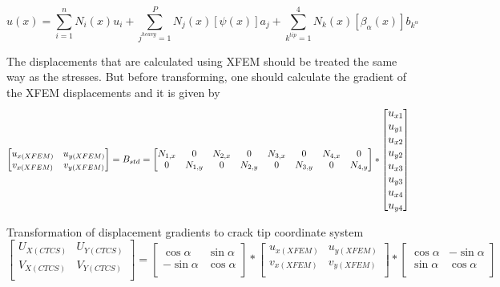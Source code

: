\documentclass[fleqn, 12.5pt,a4paper]{report}
\begin{document}
$$u(x) = \sum_{i=1}^n N_i(x)u_i + \sum_{j^{heavy}=1}^P N_j(x)[\psi(x)] a_j + \sum_{k^{tip}=1}^4 N_k(x)[\beta_{\alpha}(x)] b_{k^\alpha} $$

The displacements that are calculated using XFEM should be treated the same way as the stresses. But before transforming, one should calculate the gradient of the XFEM displacements \cite{ahmed2009extended} and it is given by
\vspace{-0.1cm}
$$
 \begin{bmatrix}
u_{x(XFEM)} & u_{y(XFEM)}\\
v_{x(XFEM)} & v_{y(XFEM)}\\
\end{bmatrix}
=
B_{std} = \begin{bmatrix}
N_{1,x} & 0 & N_{2,x} & 0 & N_{3,x} & 0 & N_{4,x} & 0 \\
0 & N_{1,y} & 0 & N_{2,y} & 0 & N_{3,y} & 0 & N_{4,y}\\
\end{bmatrix}
*
\large \begin{bmatrix}
u_{x1}\\
u_{y1}\\
u_{x2}\\
u_{y2}\\
u_{x3}\\
u_{y3}\\
u_{x4}\\
u_{y4}\\
\end{bmatrix} \large
$$

Transformation of displacement gradients to crack tip coordinate system
$$
\begin{bmatrix}
U_{X (CTCS)} & U_{Y (CTCS)}\\
V_{X (CTCS)} & V_{Y (CTCS)}\\
\end{bmatrix}
=
\begin{bmatrix}
\cos\alpha & \sin\alpha\\
-\sin\alpha & \cos\alpha\\
\end{bmatrix}
*
\begin{bmatrix}
u_{x (XFEM)} & u_{y (XFEM)}\\
v_{x (XFEM)} & v_{y (XFEM)}\\
\end{bmatrix}
*
\begin{bmatrix}
\cos\alpha & -\sin\alpha\\
\sin\alpha & \cos\alpha\\
\end{bmatrix}
$$
\end{document}
